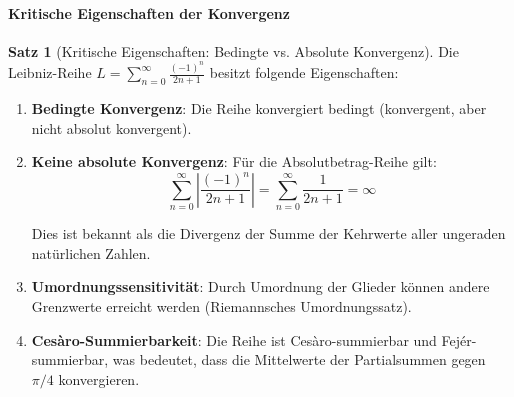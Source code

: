 \documentclass[a4paper,12pt,twoside]{report}
\theoremstyle{definition}
\newtheorem{satz}{Satz}
\begin{document}
\paragraph{Kritische Eigenschaften der Konvergenz}

\begin{satz}[Kritische Eigenschaften: Bedingte vs. Absolute Konvergenz]
Die Leibniz-Reihe $L = \sum_{n=0}^{\infty} \frac{(-1)^n}{2n+1}$ besitzt folgende Eigenschaften:

\begin{enumerate}
\item \textbf{Bedingte Konvergenz}: Die Reihe konvergiert bedingt (konvergent, aber nicht absolut konvergent).

\item \textbf{Keine absolute Konvergenz}: Für die Absolutbetrag-Reihe gilt:
\begin{equation}
\sum_{n=0}^{\infty} \left|\frac{(-1)^n}{2n+1}\right| = \sum_{n=0}^{\infty} \frac{1}{2n+1} = \infty
\end{equation}

Dies ist bekannt als die Divergenz der Summe der Kehrwerte aller ungeraden natürlichen Zahlen.

\item \textbf{Umordnungssensitivität}: Durch Umordnung der Glieder können andere Grenzwerte erreicht werden (Riemannsches Umordnungssatz).

\item \textbf{Cesàro-Summierbarkeit}: Die Reihe ist Cesàro-summierbar und Fejér-summierbar, was bedeutet, dass die Mittelwerte der Partialsummen gegen $\pi/4$ konvergieren.
\end{enumerate}
\end{satz}
\end{document}
